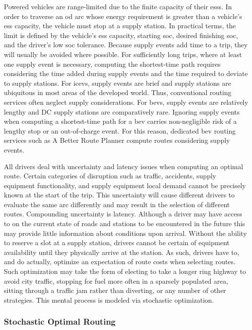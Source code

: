 Powered vehicles are range-limited due to the finite capacity of their \glspl{ess}. In order to traverse an \gls{od} arc whose energy requirement is greater than a vehicle's \gls{ess} capacity, the vehicle must stop at a supply station. In practical terms, the limit is defined by the vehicle's \gls{ess} capacity, starting \gls{soc}, desired finishing \gls{soc}, and the driver's low \gls{soc} tolerance. Because supply events add time to a trip, they will usually be avoided where possible. For sufficiently long trips, where at least one supply event is necessary, computing the shortest-time path requires considering the time added during supply events and the time required to deviate to supply stations. For \glspl{icev}, supply events are brief and supply stations are ubiquitous in most areas of the developed world. Thus, conventional routing services often neglect supply considerations. For \glspl{bev}, supply events are relatively lengthy and DC supply stations are comparatively rare. Ignoring supply events when computing a shortest-time path for a \gls{bev} carries non-negligible risk of a lengthy stop or an out-of-charge event. For this reason, dedicated \gls{bev} routing services such as A Better Route Planner compute routes considering supply events.

All drivers deal with uncertainty and latency issues when computing an optimal route. Certain categories of disruption such as traffic, accidents, supply equipment functionality, and supply equipment local demand cannot be precisely known at the start of the trip. This uncertainty will cause different drivers to evaluate the same arc differently and may result in the selection of different routes. Compounding uncertainty is latency. Although a driver may have access to on the current state of roads and stations to be encountered in the future this may provide little information about conditions upon arrival. Without the ability to reserve a slot at a supply station, drivers cannot be certain of equipment availability until they physically arrive at the station. As such, drivers have to, and do actually, optimize an expectation of route costs when selecting routes. Such optimization may take the form of electing to take a longer ring highway to avoid city traffic, stopping for fuel more often in a sparsely populated area, sitting through a traffic jam rather than diverting, or any number of other strategies. This mental process is modeled via stochastic optimization.

\subsubsection*{Stochastic Optimal Routing}

